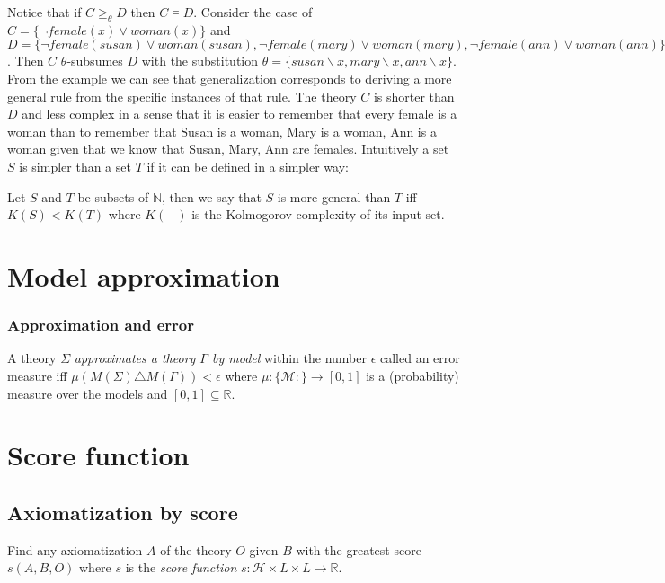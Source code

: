 Notice that if $C \ge_\theta D$ then $C \models D$. Consider the case of $C=\{\neg female(x) \vee woman(x)\}$ and
$D=\{
\neg female(susan) \vee woman(susan),
\neg female(mary) \vee woman(mary),
\neg female(ann) \vee woman(ann) \}$.
Then $C$ $\theta$-subsumes $D$ with the substitution
$\theta=\{susan \backslash x, mary \backslash x, ann \backslash x\}$.
From the example we can see that generalization corresponds to deriving a more general rule from the specific instances of that rule. The theory $C$ is shorter than $D$ and less complex in a sense that it is easier to remember that every female is a woman than to remember that Susan is a woman, Mary is a woman, Ann is a woman given that we know that Susan, Mary, Ann are females.
Intuitively a set $S$ is simpler than a set $T$ if it can be defined in a simpler way:

\begin{defn}
Let $S$ and $T$ be subsets of $\mathbb{N}$, then we say that $S$ is more general than $T$ iff $K(S)<K(T)$ where $K(-)$ is the Kolmogorov complexity of its input set.
\end{defn}

\chapter{Model approximation}

\subsection{Approximation and error}
\begin{defn}
A theory $\Sigma$ \emph{approximates a theory $\Gamma$ by model} within the number $\epsilon$ called an error measure iff $\mu(M(\Sigma) \triangle M(\Gamma)) < \epsilon$ where $\mu:\{\mathcal{M}:\}\to [0,1]$ is a (probability) measure over the models and $[0,1] \subseteq \mathbb{R}$.
\end{defn}

\chapter{Score function}

\section{Axiomatization by score}
Find any axiomatization $A$ of the theory $O$ given $B$ with the greatest score $s(A,B,O)$ where $s$ is the \emph{score function}
$s:\mathcal{H} \times L \times L \to \mathbb{R}$.

